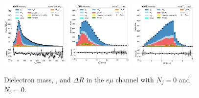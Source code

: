 \begin{figure}[htb!]
    \centering
    \includegraphics[width=0.3\textwidth]{chapters/Analysis/sectionPlots/figures/data_mc_overlays/emu_2016_cat_eq1_eq0_a_signal_linear_lepton_dilepton1_mass}
    \includegraphics[width=0.3\textwidth]{chapters/Analysis/sectionPlots/figures/data_mc_overlays/emu_2016_cat_eq1_eq0_a_signal_linear_lepton_dilepton1_pt}
    \includegraphics[width=0.3\textwidth]{chapters/Analysis/sectionPlots/figures/data_mc_overlays/emu_2016_cat_eq1_eq0_a_signal_linear_lepton_dilepton1_delta_r}
    \caption{Dielectron mass, \pt, and $\Delta R$ in the $e\mu$ channel
    with $N_{j} = 0$ and $N_{b} = 0$.}
    \label{fig:analysis:plots:emu_2_dilepton}
\end{figure}

